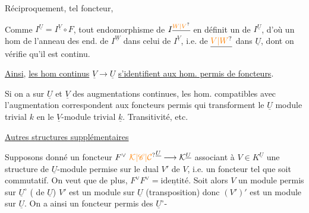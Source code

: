 Réciproquement,  tel foncteur, 

Comme $I^{\underline U}=I^{\underline V}\circ F$, tout endomorphisme
de $I^{\underline{\unsure{W|V}}}$ en définit un de $I^{\underline U}$, d'où
un hom de l'anneau des end.
de $I^{\underline W}$ dans celui de $I^{\underline V}$, i.e. de $\underline{\unsure{V|W}}$ dans
$\underline U$, dont on vérifie qu'il est continu.

\uline{Ainsi}, \uline{les hom continus} $\underline V\longrightarrow\underline U$
\uline{s'identifient aux hom. permis de foncteurs}.

Si on a sur $\underline U$ et $\underline V$ des augmentations continues,
les hom. compatibles avec l'augmentation
correspondent aux foncteurs permis qui transforment
le $\underline U$ module trivial  $k$ en le $\underline V$-module trivial $\underline k$.
Transitivité, etc.


\uline{Autres structures supplémentaires}

 Supposons donné un foncteur $F^\vee\ \unsure{\mathcal K|\mathscr C|\mathcal C}^{\underline U}\longrightarrow\mathcal K^{\underline U}$
associant à  $V\in K^{\underline U}$ une structure
de $\underline U$-module permise sur le dual $V'$ de $V$,
i.e. un foncteur tel que
soit commutatif. 
On veut que de plus,
$F^\vee F^\vee={}\underline{\text{identité}}$.  
 Soit alors $V$ un
 module permis sur $\underline U^\circ$
( de $\underline U$) $V'$ est un module sur
$\underline U$ (transposition) donc $(V')'$ est un
module sur $\underline U$. On a ainsi un
 foncteur permis des $\underline U^\circ$-

